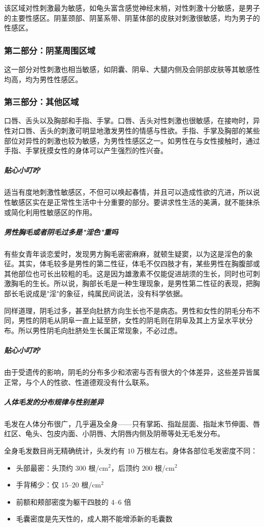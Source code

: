 该区域对性刺激最为敏感，如龟头富含感觉神经末梢，对性刺激十分敏感，是男子的主要性感区。阴茎颈部、阴茎系带、阴茎体部的皮肤对刺激很敏感，均为男子的性感区。

\subsubsection{第二部分：阴茎周围区域}

这一部分对性刺激也相当敏感，如阴囊、阴阜、大腿内侧及会阴部皮肤等其敏感性均高，均为男性性感区。

\subsubsection{第三部分：其他区域}

口唇、舌头以及胸部和手指、手掌。口唇、舌头对性刺激也很敏感，在接吻时，异性对口唇、舌头的刺激可明显地激发男性的情感与性欲。手指、手掌及胸部的某些部位对异性的刺激也较为敏感，为男性性感区之一。如男性在与女性接触时，通过手指、手掌抚摸女性的身体可以产生强烈的性兴奋。

\subparagraph{贴心小叮咛}

适当有度地刺激性敏感区，不但可以唤起春情，并且可以造成性欲的亢进，所以说性敏感区实在是正常性生活中十分重要的部分。要讲求性生活的美满，就不能抹杀或简化利用性敏感区的作用。

\subparagraph{男性胸毛或者阴毛过多是"淫色"重吗}

有些女青年谈恋爱时，发现男方胸毛密密麻麻，就顿生疑窦，以为这是淫色的象征。其实，体毛较多是男性的第二性征，体毛不仅四肢才有，某些男性在胸腹部或其他部位也可长出较粗的毛。这是因为雄激素不仅能促进胡须的生长，同时也可刺激胸毛的生长。所以说，胸部长毛是一种生理现象，是男性第二性征的表现，把胸部长毛说成是"淫"的象征，纯属民间说法，没有科学依据。

同样道理，阴毛过多，甚至向肚脐方向生长也不是病态。男性和女性的阴毛分布不同，男性的阴毛从阴阜一直上延至脐，女性的阴毛则在阴阜及其上方呈水平状分布。所以男性阴毛向肚脐处生长属正常现象，不必过虑。

\subparagraph{贴心小叮咛}

由于受遗传的影响，阴毛的分布多少和浓密与否有很大的个体差异，这些差异皆属正常，与个人的性欲、性道德观没有什么联系。

\subparagraph{人体毛发的分布规律与性别差异}

毛发在人体分布很广，几乎遍及全身——只有掌跖、指趾屈面、指趾末节伸面、唇红区、龟头、包皮内面、小阴唇、大阴唇内侧及阴蒂等处无毛发分布。

全身毛发数目尚无精确统计，头发约有 $10$ 万根左右。身体各部位毛发密度不同：
\begin{itemize}
	\item 头部最密：头顶约 $300$ 根/cm$^2$，后顶约 $200$ 根/cm$^2$
	\item 手背稀少：仅 $15$--$20$ 根/cm$^2$
	\item 前额和颊部密度为躯干四肢的 $4$--$6$ 倍
	\item 毛囊密度是先天性的，成人期不能增添新的毛囊数
\end{itemize}

